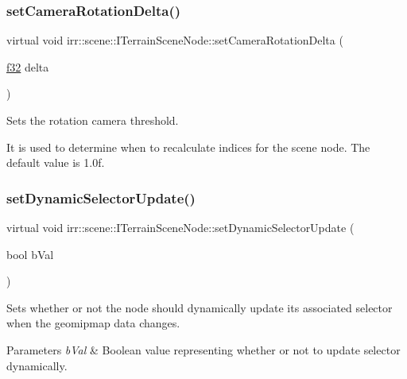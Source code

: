 \subsubsection{\texorpdfstring{set\+Camera\+Rotation\+Delta()}{setCameraRotationDelta()}}
{\footnotesize\ttfamily virtual void irr\+::scene\+::\+I\+Terrain\+Scene\+Node\+::set\+Camera\+Rotation\+Delta (\begin{DoxyParamCaption}\item[{\hyperlink{namespaceirr_a0277be98d67dc26ff93b1a6a1d086b07}{f32}}]{delta }\end{DoxyParamCaption})\hspace{0.3cm}{\ttfamily [pure virtual]}}



Sets the rotation camera threshold. 

It is used to determine when to recalculate indices for the scene node. The default value is 1.\+0f. \mbox{\label{classirr_1_1scene_1_1ITerrainSceneNode_a95cf695e54f1ef3376f7a3666c2dd834}} 
\subsubsection{\texorpdfstring{set\+Dynamic\+Selector\+Update()}{setDynamicSelectorUpdate()}}
{\footnotesize\ttfamily virtual void irr\+::scene\+::\+I\+Terrain\+Scene\+Node\+::set\+Dynamic\+Selector\+Update (\begin{DoxyParamCaption}\item[{bool}]{b\+Val }\end{DoxyParamCaption})\hspace{0.3cm}{\ttfamily [pure virtual]}}



Sets whether or not the node should dynamically update its associated selector when the geomipmap data changes. 


\begin{DoxyParams}{Parameters}
{\em b\+Val} & Boolean value representing whether or not to update selector dynamically. \\
\hline
\end{DoxyParams}
\mbox{\label{classirr_1_1scene_1_1ITerrainSceneNode_a41b7f1ee70511d648cc11217347160ad}} 
